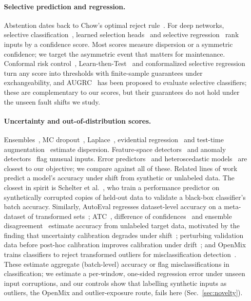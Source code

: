 \documentclass{esannV2}
\begin{document}
\paragraph{Selective prediction and regression.} Abstention dates back to Chow's optimal reject rule~\cite{chow1970optimum}. For deep networks, selective classification~\cite{geifman2017selective}, learned selection heads~\cite{geifman2019selectivenet} and selective regression~\cite{zaoui2020regression,jiang2020riskcontrolled} rank inputs by a confidence score. Most scores measure dispersion or a symmetric confidence; we target the asymmetric event that matters for maintenance. Conformal risk control~\cite{angelopoulos2024conformal}, Learn-then-Test~\cite{angelopoulos2021ltt} and conformalized selective regression~\cite{sokol2026conformalized} turn any score into thresholds with finite-sample guarantees under exchangeability, and AUGRC~\cite{traub2024overcoming} has been proposed to evaluate selective classifiers; these are complementary to our scores, but their guarantees do not hold under the unseen fault shifts we study.

\paragraph{Uncertainty and out-of-distribution scores.} Ensembles~\cite{lakshminarayanan2017simple}, MC dropout~\cite{gal2016dropout}, Laplace~\cite{daxberger2021laplace}, evidential regression~\cite{amini2020deep} and test-time augmentation~\cite{wang2019aleatoric} estimate dispersion. Feature-space detectors~\cite{lee2018simple,sun2022out} and anomaly detectors~\cite{liu2008isolation} flag unusual inputs. Error predictors~\cite{corbiere2019addressing,kamath2020selective,yoo2019learning} and heteroscedastic models~\cite{nix1994estimating} are closest to our objective; we compare against all of these. Related lines of work predict a model's accuracy under shift from synthetic or unlabeled data. The closest in spirit is Schelter et al.~\cite{schelter2020learning}, who train a performance predictor on synthetically corrupted copies of held-out data to validate a black-box classifier's batch accuracy. Similarly, AutoEval regresses dataset-level accuracy on a meta-dataset of transformed sets~\cite{deng2021labels}; ATC~\cite{garg2022leveraging}, difference of confidences~\cite{guillory2021predicting} and ensemble disagreement~\cite{jiang2022assessing} estimate accuracy from unlabeled target data, motivated by the finding that uncertainty calibration degrades under shift~\cite{ovadia2019trust}; perturbing validation data before post-hoc calibration improves calibration under drift~\cite{tomani2021posthoc}; and OpenMix trains classifiers to reject transformed outliers for misclassification detection~\cite{zhu2023openmix}. These estimate aggregate (batch-level) accuracy or flag misclassifications in classification; we estimate a per-window, one-sided regression error under unseen input corruptions, and our controls show that labelling synthetic inputs as outliers, the OpenMix and outlier-exposure route, fails here (Sec.~\ref{sec:novelty}).
\end{document}
